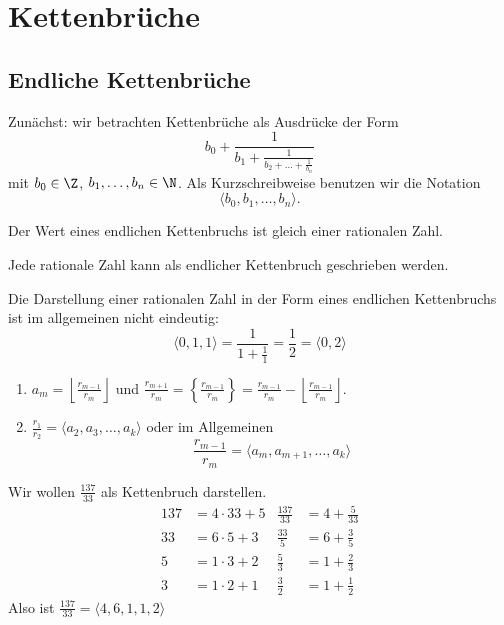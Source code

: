 \chapter{Kettenbrüche}

\section{Endliche Kettenbrüche}

Zunächst: wir betrachten Kettenbrüche als Ausdrücke der Form
\[ b_0 + \frac{1}{b_1 + \frac{1}{b_2 + \dots + \frac{1}{b_n}}} \]
mit $b_0 \in \Z$, $b_1, \dotsc, b_n \in \N$. Als Kurzschreibweise benutzen wir die Notation
\[ \langle b_0,b_1,\dotsc,b_n \rangle. \]

\begin{rem*}
	Der Wert eines endlichen Kettenbruchs ist gleich einer rationalen Zahl.
\end{rem*}

\begin{lem}\autolabel
	Jede rationale Zahl kann als endlicher Kettenbruch geschrieben werden.
\end{lem}

\begin{cav*}
	Die Darstellung einer rationalen Zahl in der Form eines endlichen Kettenbruchs ist im allgemeinen nicht eindeutig:
	\[ \langle 0,1,1 \rangle = \frac{1}{1 + \frac{1}{1}} = \frac{1}{2} = \langle 0,2 \rangle \]
\end{cav*}

\begin{rem*}
	\begin{enumerate}[label={\roman*})]
		\item $a_m = \left\lfloor \frac{r_{m-1}}{r_m} \right\rfloor$ und \( \frac{r_{m+1}}{r_m} = \left\{ \frac{r_{m-1}}{r_m} \right\} = \frac{r_{m-1}}{r_m} - \left\lfloor \frac{r_{m-1}}{r_m} \right\rfloor. \)
		\item \( \frac{r_1}{r_2} = \langle a_2,a_3,\dotsc,a_k \rangle \) oder im Allgemeinen
		\[ \frac{r_{m-1}}{r_m} = \langle a_m, a_{m+1},\dotsc,a_k \rangle \]
	\end{enumerate}
\end{rem*}

\begin{exmp*}
	Wir wollen $\frac{137}{33}$ als Kettenbruch darstellen.
	\begin{align*}
		137 &= 4 \cdot 33 + 5 	& \frac{137}{33} &= 4 + \frac{5}{33}\\
		33 &= 6 \cdot 5 + 3 	& \frac{33}{5} 	&= 6 + \frac{3}{5}\\
		5 &= 1 \cdot 3 + 2 		& \frac{5}{3} 	&= 1 + \frac{2}{3}\\
		3 &= 1 \cdot 2 + 1 		& \frac{3}{2} 	&=1 + \frac{1}{2}
	\end{align*}
	Also ist \( \frac{137}{33} = \langle 4,6,1,1,2 \rangle \)
\end{exmp*}

